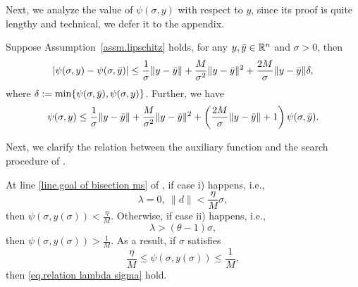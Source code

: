 \documentclass{mcom-l}
\numberwithin{equation}{section}
\begin{document}
Next, we analyze the value of $\psi(\sigma,y)$ with respect to $y$, since its proof is quite lengthy and technical, we defer it to the appendix.
\begin{lemma}
    \label{lem.psi property wrt y}
    Suppose Assumption~\ref{assm.lipschitz} holds, for any $y,\Bar{y} \in \mathbb{R}^n$ and $\sigma>0$, then
    \begin{equation}
        \label{eq.psi property wrt y}
        \left \vert \psi(\sigma,y)-\psi(\sigma,\Bar{y}) \right\vert \leq \frac{1}{\sigma}\|y-\Bar{y}\| +\frac{M}{\sigma^2}\|y-\Bar{y}\|^2 +\frac{2M}{\sigma}\|y-\Bar{y}\|\delta,
    \end{equation}
    where $\delta:=\min\{\psi(\sigma,\Bar{y}),\psi(\sigma,y)\}$. Further, we have
    \begin{equation}
        \label{eq.psi property wrt y advanced}
        \psi(\sigma,y) \leq \frac{1}{\sigma}\|y-\Bar{y}\| +\frac{M}{\sigma^2}\|y-\Bar{y}\|^2 +\left(\frac{2M}{\sigma}\|y-\Bar{y}\|+1\right)\psi(\sigma,\Bar{y}).
    \end{equation}
\end{lemma}
Next, we clarify the relation between the auxiliary function and the search procedure of .
\begin{lemma}
    \label{lem.reduce line search}
    At line \ref{line.goal of bisection ms} of , if case i) happens, i.e.,
    \begin{equation}
        \label{eq.bracket small lambda}
        \lambda = 0, \ \|d\|<\frac{\eta}{M}\sigma,
    \end{equation}
    then $\psi(\sigma,y(\sigma))<\frac{\eta}{M}$.  Otherwise, if case ii) happens, i.e.,
    \begin{equation}
        \label{eq.bracket big lambda}
        \lambda > (\theta-1)\sigma,
    \end{equation}
    then $\psi(\sigma,y(\sigma))>\frac{1}{M}$. As a result, if $\sigma$ satisfies
    \begin{equation}
        \label{eq.reduce line search interval}
        \frac{\eta}{M}\leq \psi(\sigma,y(\sigma)) \leq \frac{1}{M},
    \end{equation}
    then \eqref{eq.relation lambda sigma} hold.
\end{lemma}
\end{document}
